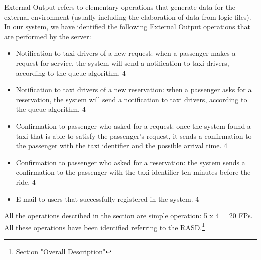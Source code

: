 External Output refers to elementary operations that generate data for the external environment (usually including the elaboration of data from logic files).
\newline
In our system, we have identified the following External Output operations that are performed by the server:
\begin{itemize}
    \item Notification to taxi drivers of a new request: when a passenger makes a request for service, the system will send a notification to taxi drivers, according to the queue algorithm. 4
    \item Notification to taxi drivers of a new reservation: when a passenger asks for a reservation, the system will send a notification to taxi drivers, according to the queue algorithm. 4
    \item Confirmation to passenger who asked for a request: once the system found a taxi that is able to satisfy the passenger's request, it sends a confirmation to the passenger with the taxi identifier and the possible arrival time. 4
    \item Confirmation to passenger who asked for a reservation: the system sends a confirmation to the passenger with the taxi identifier ten minutes before the ride. 4
    \item E-mail to users that successfully registered in the system. 4
\end{itemize}
All the operations described in the section are simple operation: 5 x 4 = 20 FPs.
\newline
All these operations have been identified referring to the RASD.\footnote{Section "Overall Description"}
